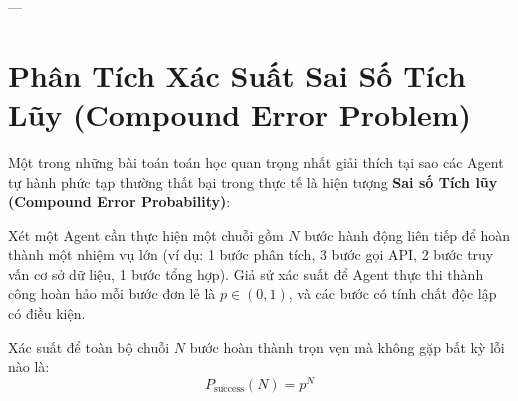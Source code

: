 ---

\section{Phân Tích Xác Suất Sai Số Tích Lũy (Compound Error Problem)}
\label{sec:compound-error-analysis}

Một trong những bài toán toán học quan trọng nhất giải thích tại sao các Agent tự hành phức tạp thường thất bại trong thực tế là hiện tượng \textbf{Sai số Tích lũy (Compound Error Probability)}:

\begin{theorem}
Xét một Agent cần thực hiện một chuỗi gồm $N$ bước hành động liên tiếp để hoàn thành một nhiệm vụ lớn (ví dụ: 1 bước phân tích, 3 bước gọi API, 2 bước truy vấn cơ sở dữ liệu, 1 bước tổng hợp).
Giả sử xác suất để Agent thực thi thành công hoàn hảo mỗi bước đơn lẻ là $p \in (0, 1)$, và các bước có tính chất độc lập có điều kiện.

Xác suất để toàn bộ chuỗi $N$ bước hoàn thành trọn vẹn mà không gặp bất kỳ lỗi nào là:
\begin{equation}
P_{\text{success}}(N) = p^N
\end{equation}
\end{theorem}

